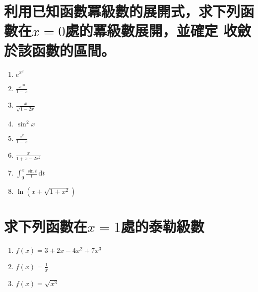 \documentclass[a4paper,12pt]{article}
\begin{document}
\begin{CJK*}{UTF8}{bsmi}
\section{利用已知函數冪級數的展開式，求下列函數在$x=0$處的冪級數展開，並確定
    收斂於該函數的區間。}
    \begin{enumerate}[label={\rm(\arabic*)}]
        \item $\displaystyle e^{x^2}$
        \item $\displaystyle \frac{x^{10}}{1-x}$
        \item $\displaystyle \frac{x}{\sqrt{1-2x}}$
        \item $\displaystyle \sin^2 x$
        \item $\displaystyle \frac{e^x}{1-x}$
        \item $\displaystyle \frac{x}{1+x-2x^2}$
        \item $\displaystyle \int_0^x \frac{\sin t}{t}\, \mathrm{d}t$
        \item $\displaystyle \ln \left(x + \sqrt{1+x^2}\right)$
    \end{enumerate}

    \section{求下列函數在$x=1$處的泰勒級數}
    \begin{enumerate}[label={\rm(\arabic*)}]
        \item $\displaystyle f(x) = 3 + 2x - 4x^2 + 7x^3$
        \item $\displaystyle f(x) = \frac{1}{x}$
        \item $\displaystyle f(x) = \sqrt{x^3}$
    \end{enumerate}
\end{CJK*}
\end{document}
